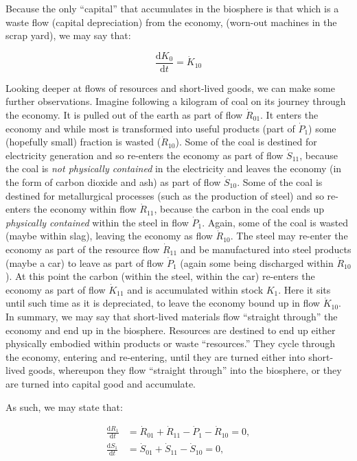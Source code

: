 Because the only ``capital'' that accumulates 
in the biosphere
is that which is a waste flow 
(capital depreciation)
from the economy,
(worn-out machines in the scrap yard),
we may say that:

\begin{equation} \label{eq:A_K0_balance}
	\frac{\mathrm{d}K_{0}}{\mathrm{d}t}		
	= \dot{K}_{10}
\end{equation}

Looking deeper at flows of resources and short-lived goods,
we can make some further observations. 
Imagine following a kilogram of coal on its journey through the economy. 
It is pulled out of the earth as part of flow $\dot{R}_{01}$. 
It enters the economy and while most 
is transformed into useful
products (part of $\dot{P}_{1}$) some (hopefully small)
fraction is wasted ($\dot{R}_{10}$).
Some of the coal is destined for electricity generation
and so re-enters the economy as part of flow $\dot{S}_{11}$,
because the coal is \emph{not physically contained}
in the electricity and leaves the economy
(in the form of carbon dioxide and ash)
as part of flow $\dot{S}_{10}$.
Some of the coal is destined for metallurgical processes 
(such as the production of steel)
and so re-enters the economy within flow $\dot{R}_{11}$,
because the carbon in the coal ends up 
\emph{physically contained} within the steel in flow $\dot{P}_{1}$.
Again,
some of the coal is wasted (maybe within slag), 
leaving the economy as flow $\dot{R}_{10}$.
The steel may re-enter the economy as part of
the resource flow $\dot{R}_{11}$ and be manufactured
into steel products (maybe a car) to leave as part of
flow $\dot{P}_{1}$
(again some being discharged within $\dot{R}_{10}$).
At this point the carbon 
(within the steel, within the car)
re-enters the economy as part of flow $\dot{K}_{11}$
and is accumulated within stock $K_{1}$.
Here it sits until such time as it is depreciated,
to leave the economy bound up in flow $\dot{K}_{10}$.
In summary, we may say that short-lived materials flow 
``straight through'' the economy and end up in the biosphere. 
 Resources are destined
to end up either physically embodied within products or waste ``resources.''
They cycle through the economy,
entering and re-entering,
until they are turned either into short-lived goods,
whereupon they flow ``straight through'' into the biosphere,
or they are turned into capital good and accumulate.

As such,
we may state that:

\begin{align}
	\frac{\mathrm{d}R_1}{\mathrm{d}t}		&
	= \dot{R}_{01}
	+ \dot{R}_{11}
	- \dot{P}_{1}
	- \dot{R}_{10}
	= 0,															\\
\label{eq:A_S1_balance}
	\frac{\mathrm{d}S_1}{\mathrm{d}t}		&
	= \dot{S}_{01}
	+ \dot{S}_{11}
	- \dot{S}_{10}
	= 0,
\end{align}


